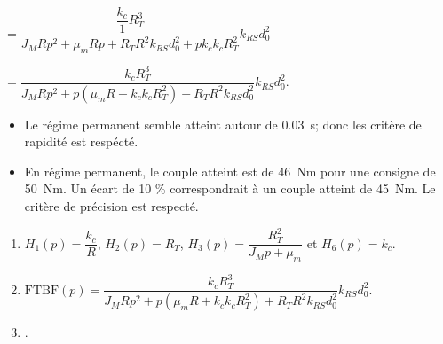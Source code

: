 \begin{corrigebox}
$= \dfrac{\dfrac{k_c}{1} R_T^3}{J_MR p^2  + \mu_m R p+R_TR^2k_{RS}d_0^2+pk_ck_c R_T^2}k_{RS}d_0^2 $

$= \dfrac{k_c R_T^3}{J_MR p^2  + p\left(\mu_m R  +k_ck_c R_T^2\right)+R_TR^2k_{RS}d_0^2}k_{RS}d_0^2 $.
\begin{itemize}
\item Le régime permanent semble atteint autour de \SI{0,03}{s}; donc les critère de rapidité est respécté.
\item En régime permanent, le couple atteint est de \SI{46}{Nm} pour une consigne de \SI{50}{Nm}. Un écart de 10 \% correspondrait à un couple atteint de \SI{45}{Nm}. Le critère de précision est respecté.
\end{itemize}

\footnotesize
\begin{enumerate}
\item  $H_1(p)=\dfrac{k_c}{R}$, $H_2(p)=R_T$,  $H_3(p) = \dfrac{R_T^2}{J_M p  + \mu_m }$ et   $H_6(p)={k_c}$.
\item $\text{FTBF}(p)= \dfrac{k_c R_T^3}{J_MR p^2  + p\left(\mu_m R  +k_ck_c R_T^2\right)+R_TR^2k_{RS}d_0^2}k_{RS}d_0^2 $.
\item .
\end{enumerate} 
\normalsize
\end{corrigebox}
